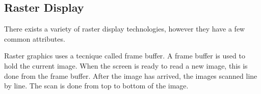 \subsection{Raster Display}
There exists a variety of raster display technologies, however they have a few common attributes.

Raster graphics uses a tecnique called frame buffer.
A frame buffer is used to hold the current image.
When the screen is ready to read a new image, this is done from the frame buffer.
After the image has arrived, the images scanned line by line.
The scan is done from top to bottom of the image.
